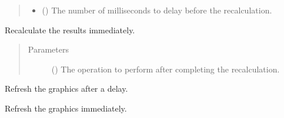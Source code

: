 \documentclass[letterpaper,10pt,english]{sphinxmanual}
\begin{document}
\begin{fulllineitems}
\begin{fulllineitems}
\begin{quote}
\begin{description}
\begin{itemize}
\item {} 
 () \textendash{} The number of milliseconds to delay before the recalculation.

\end{itemize}

\end{description}\end{quote}

\end{fulllineitems}


\begin{fulllineitems}
\label{\detokenize{doc-src/tyche:tyche.DecisionGUI.DecisionWindow.reevaluate_immediate}}
Recalculate the results immediately.
\begin{quote}\begin{description}
\item[{Parameters}] \leavevmode
{} () \textendash{} The operation to perform after completing the recalculation.

\end{description}\end{quote}

\end{fulllineitems}


\begin{fulllineitems}
\label{\detokenize{doc-src/tyche:tyche.DecisionGUI.DecisionWindow.refresh}}
Refresh the graphics after a delay.

\end{fulllineitems}


\begin{fulllineitems}
\label{\detokenize{doc-src/tyche:tyche.DecisionGUI.DecisionWindow.refresh_immediate}}
Refresh the graphics immediately.

\end{fulllineitems}


\end{fulllineitems}
\end{document}
